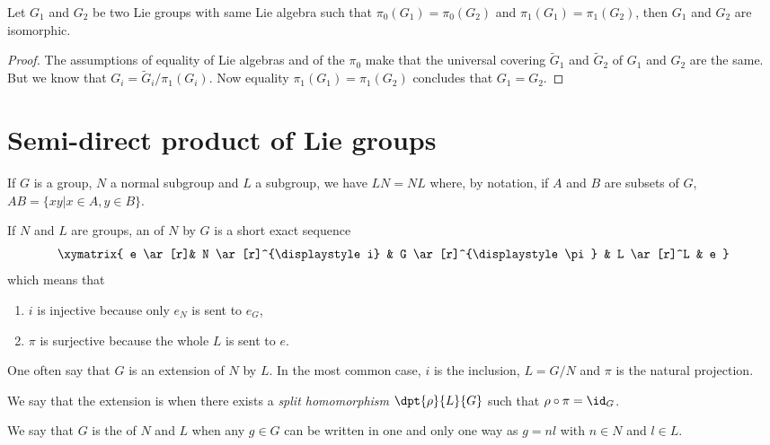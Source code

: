 \begin{proposition}
	Let $G_1$ and $G_2$ be two Lie groups with same Lie algebra such that $\pi_0(G_1)=\pi_0(G_2)$ and $\pi_1(G_1)=\pi_1(G_2)$, then $G_1$ and $G_2$ are isomorphic.
\end{proposition}

\begin{proof}
	The assumptions of equality of Lie algebras and of the $\pi_0$ make that the universal covering $\tilde G_1$ and $\tilde G_2$ of $G_1$ and $G_2$ are the same. But we know that $G_i=\tilde G_i/\pi_1(G_i)$. Now equality $\pi_1(G_1)=\pi_1(G_2)$ concludes that $G_1=G_2$.
\end{proof}

\section{Semi-direct product of Lie groups}


If $G$ is a group, $N$ a normal subgroup and $L$ a subgroup, we have $LN=NL$ where, by notation, if $A$ and $B$ are subsets of $G$, $AB=\{xy|x\in A,y\in B\}$.

If $N$ and $L$ are groups, an  of $N$ by $G$ is a short exact sequence
\begin{equation}
	\xymatrix{ e \ar[r]& N \ar[r]^{\displaystyle i} & G \ar[r]^{\displaystyle \pi} & L \ar[r]^L  & e }
\end{equation}
which means that

\begin{enumerate}
	\item $i$ is injective because only $e_N$ is sent to $e_G$,
	\item $\pi$ is surjective because the whole $L$ is sent to $e$.
\end{enumerate}
One often say that $G$ is an extension of $N$ by $L$. In the most common case, $i$ is the inclusion, $L=G/N$ and $\pi$ is the natural projection.

We say that the extension is  when there exists a \emph{split homomorphism} $\dpt{\rho}{L}{G}$ such that $\rho\circ\pi=\id_G$.

\begin{definition}
	We say that $G$ is the  of $N$ and $L$ when any $g\in G$ can be written in one and only one way as $g=nl$ with $n\in N$ and $l\in L$.
\end{definition}


